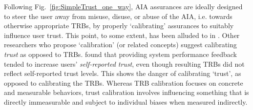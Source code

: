     Following Fig.~\ref{fig:SimpleTrust_one_way}, AIA assurances are ideally designed to steer the user away from misuse, disuse, or abuse of the AIA, i.e. towards otherwise appropriate TRBs, by properly `calibrating' assurances to suitably influence user trust. This point, to some extent, has been alluded to in \cite{Muir1994-ow,Lillard2016-yg,Lee2004-pv,Hutchins2015-if}. Other researchers who propose `calibration' (or related concepts) suggest calibrating \emph{trust} as opposed to TRBs. \citet{Dzindolet2003-ts} found that providing system performance feedback tended to increase users' \textit{self-reported trust}, even though resulting TRBs did not reflect self-reported trust levels. This shows the danger of calibrating `trust', as opposed to calibrating the TRBs. Whereas TRB calibration focuses on concrete and measurable behaviors, trust calibration involves influencing something that is directly immeasurable and subject to individual biases when measured indirectly. 

